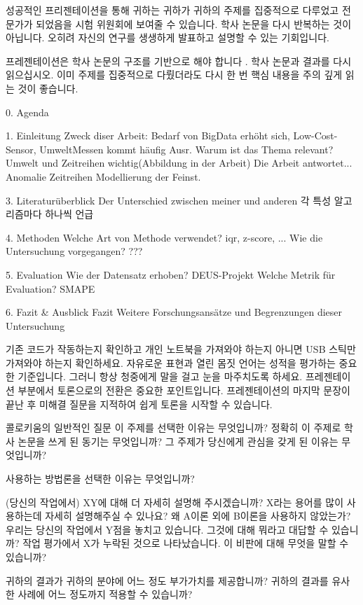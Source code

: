 성공적인 프리젠테이션을 통해 귀하는 귀하가 귀하의 주제를 집중적으로 다루었고 전문가가 되었음을 시험 위원회에 보여줄 수 있습니다.
학사 논문을 다시 반복하는 것이 아닙니다. 오히려 자신의 연구를 생생하게 발표하고 설명할 수 있는 기회입니다.

프레젠테이션은 학사 논문의 구조를 기반으로 해야 합니다 .
학사 논문과 결과를 다시 읽으십시오. 이미 주제를 집중적으로 다뤘더라도 다시 한 번 핵심 내용을 주의 깊게 읽는 것이 좋습니다.


0. Agenda

1. Einleitung
    Zweck diser Arbeit: Bedarf von BigData erhöht sich, Low-Cost-Sensor, UmweltMessen kommt häufig Ausr.
    Warum ist das Thema relevant? Umwelt und Zeitreihen wichtig(Abbildung in der Arbeit)
    Die Arbeit antwortet... 
    Anomalie
    Zeitreihen
    Modellierung der Feinst.

3. Literaturüberblick
    Der Unterschied zwischen meiner und anderen
    각 특성 알고리즘마다 하나씩 언급

4. Methoden
    Welche Art von Methode verwendet? iqr, z-score, ...
    Wie die Untersuchung vorgegangen? ???

    
    

5. Evaluation
    Wie der Datensatz erhoben?  DEUS-Projekt
    Welche Metrik für Evaluation?  SMAPE
    
6. Fazit & Ausblick
    Fazit
    Weitere Forschungsansätze und Begrenzungen dieser Untersuchung








기존 코드가 작동하는지 확인하고 개인 노트북을 가져와야 하는지 아니면 USB 스틱만 가져와야 하는지 확인하세요.
자유로운 표현과 열린 몸짓 언어는 성적을 평가하는 중요한 기준입니다. 그러니 항상 청중에게 말을 걸고 눈을 마주치도록 하세요.
프레젠테이션 부분에서 토론으로의 전환은 중요한 포인트입니다. 프레젠테이션의 마지막 문장이 끝난 후 미해결 질문을 지적하여 쉽게 토론을 시작할 수 있습니다.




콜로키움의 일반적인 질문
    이 주제를 선택한 이유는 무엇입니까?
    정확히 이 주제로 학사 논문을 쓰게 된 동기는 무엇입니까?
    그 주제가 당신에게 관심을 갖게 된 이유는 무엇입니까?

    사용하는 방법론을 선택한 이유는 무엇입니까?

    (당신의 작업에서) XY에 대해 더 자세히 설명해 주시겠습니까?
    X라는 용어를 많이 사용하는데 자세히 설명해주실 수 있나요?
    왜 A이론 외에 B이론을 사용하지 않았는가?
    우리는 당신의 작업에서 Y점을 놓치고 있습니다. 그것에 대해 뭐라고 대답할 수 있습니까?
    작업 평가에서 X가 누락된 것으로 나타났습니다. 이 비판에 대해 무엇을 말할 수 있습니까?

    귀하의 결과가 귀하의 분야에 어느 정도 부가가치를 제공합니까?
    귀하의 결과를 유사한 사례에 어느 정도까지 적용할 수 있습니까?